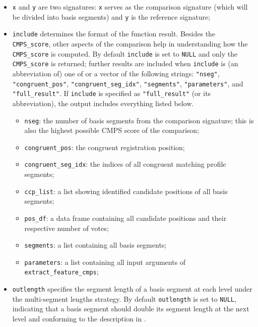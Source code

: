 \begin{itemize}
\item
  \texttt{x} and \texttt{y} are two signatures: \texttt{x} serves as the
  comparison signature (which will be divided into basis segments) and
  \texttt{y} is the reference signature;
\item
  \texttt{include} determines the format of the function result. Besides
  the \texttt{CMPS\_score}, other aspects of the comparison help in
  understanding how the \texttt{CMPS\_score} is computed. By default
  \texttt{include} is set to \texttt{NULL} and only the
  \texttt{CMPS\_score} is returned; further results are included when
  \texttt{include} is (an abbreviation of) one of or a vector of the
  following strings: \texttt{"nseg"}, \texttt{"congruent\_pos"},
  \texttt{"congruent\_seg\_idx"}, \texttt{"segments"},
  \texttt{"parameters"}, and \texttt{"full\_result"}. If
  \texttt{include} is specified as \texttt{"full\_result"} (or its
  abbreviation), the output includes everything listed below.

  \begin{itemize}
  \tightlist
  \item
    \texttt{nseg}: the number of basis segments from the comparison
    signature; this is also the highest possible CMPS score of the
    comparison;
  \item
    \texttt{congruent\_pos}: the congruent registration position;
  \item
    \texttt{congruent\_seg\_idx}: the indices of all congruent matching
    profile segments;
  \item
    \texttt{ccp\_list}: a list showing identified candidate positions of
    all basis segments;
  \item
    \texttt{pos\_df}: a data frame containing all candidate positions
    and their respective number of votes;
  \item
    \texttt{segments}: a list containing all basis segments;
  \item
    \texttt{parameters}: a list containing all input arguments of
    \texttt{extract\_feature\_cmps};
  \end{itemize}
\item
  \texttt{outlength} specifies the segment length of a basis segment at
  each level under the multi-segment lengths strategy. By default
  \texttt{outlength} is set to \texttt{NULL}, indicating that a basis
  segment should double its segment length at the next level and
  conforming to the description in \citet{cmps} .
\end{itemize}

